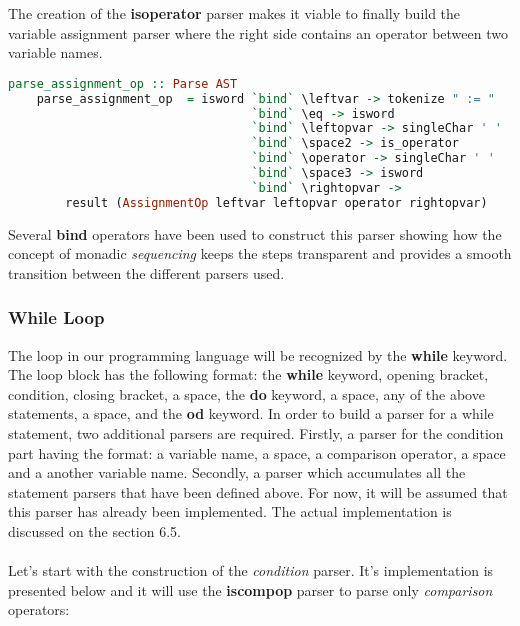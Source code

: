 \documentclass[a4paper, onecolumn]{article}
\begin{document}
    \noindent The creation of the \textbf{is\textunderscore operator} parser makes it viable to finally build the variable assignment parser where the right side contains an operator between two variable names. 
    
    \begin{tcolorbox}
    \begin{lstlisting}[language=Haskell] 
    parse_assignment_op :: Parse AST
    parse_assignment_op  = isword `bind` \leftvar -> tokenize " := " 
                                  `bind` \eq -> isword 
                                  `bind` \leftopvar -> singleChar ' ' 
                                  `bind` \space2 -> is_operator 
                                  `bind` \operator -> singleChar ' ' 
                                  `bind` \space3 -> isword 
                                  `bind` \rightopvar -> 
        result (AssignmentOp leftvar leftopvar operator rightopvar)
    \end{lstlisting}
    \end{tcolorbox}
    
    \noindent Several \textbf{bind} operators have been used to construct this parser showing how the concept of monadic \textit{sequencing} keeps the steps transparent and provides a smooth transition between the different parsers used. 
    
    \subsubsection{While Loop}
    
    The loop in our programming language will be recognized by the \textbf{while} keyword. The loop block has the following format: the \textbf{while} keyword, opening bracket, condition, closing bracket, a space, the \textbf{do} keyword, a space, any of the above statements, a space, and the \textbf{od} keyword. In order to build a parser for a while statement, two additional parsers are required. Firstly, a parser for the condition part having the format: a variable name, a space, a comparison operator, a space and a another variable name. Secondly, a parser which accumulates all the statement parsers that have been defined above. For now, it will be assumed that this parser has already been implemented. The actual implementation is discussed on the section 6.5. \\ \\
    \noindent Let's start with the construction of the \textit{condition} parser. It's implementation is presented below and it will use the \textbf{is\textunderscore comp\textunderscore op} parser to parse only \textit{comparison} operators: 
    
\end{document}
